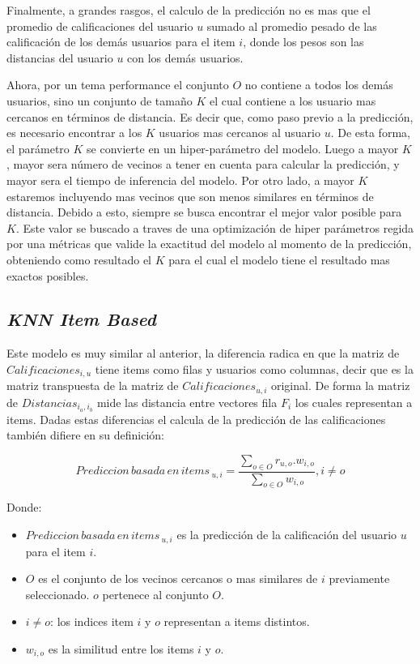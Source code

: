 \documentclass[11pt,a4paper,twoside]{thesis}
\begin{document}
Finalmente, a grandes rasgos, el calculo de la predicción no es mas que el promedio de calificaciones del usuario $u$ sumado al promedio pesado de las calificación de los demás usuarios para el item $i$, donde los pesos son las distancias del usuario $u$ con los demás usuarios.

Ahora, por un tema performance el conjunto $O$ no contiene a todos los demás usuarios, sino un conjunto de tamaño $K$ el cual contiene a los usuario mas cercanos en términos de distancia. Es decir que, como paso previo a la predicción, es necesario encontrar a los $K$ usuarios mas cercanos al usuario $u$. De esta forma, el parámetro $K$ se convierte en un hiper-parámetro del modelo. Luego a mayor $K$, mayor sera número de vecinos a tener en cuenta para calcular la predicción, y mayor sera el tiempo de inferencia del modelo. Por otro lado, a mayor $K$ estaremos incluyendo mas vecinos que son menos similares en términos de distancia. Debido a esto, siempre se busca encontrar el mejor valor posible para $K$. Este valor se buscado a traves de una optimización de hiper parámetros regida por una métricas que valide la exactitud del modelo al momento de la predicción, obteniendo como resultado el $K$ para el cual el modelo tiene el resultado mas exactos posibles.

\subsection{\textit{KNN Item Based}}

Este modelo es muy similar al anterior, la diferencia radica en que la matriz de $Calificaciones_{i, u}$ tiene items como filas y usuarios como columnas, decir que es la matriz transpuesta de la matriz de $Calificaciones_{u, i}$ original. De forma la matriz de $Distancias_{i_a,i_b}$ mide las distancia entre vectores fila $F_i$ los cuales representan a items. Dadas estas diferencias el calcula de la predicción de las calificaciones también difiere en su definición:


\begin{equation}
	Prediccion \mspace{3mu}basada \mspace{3mu}en \mspace{3mu}items\mspace{3mu}_{u, i} = \frac{\sum_{o \in O} r_{u, o}. w_{i, o} }{\sum_{o \in O} w_{i, o} }, i \neq o
\end{equation}
\begin{description}
	\item[Donde:]
\end{description}
\begin{itemize}
	\item $Prediccion \mspace{3mu}basada \mspace{3mu}en \mspace{3mu}items\mspace{3mu}_{u, i}$ es la predicción de la calificación del usuario $u$ para el item $i$.
	\item $O$ es el conjunto de los vecinos cercanos o mas similares de $i$ previamente seleccionado. $o$ pertenece al conjunto $O$.
	\item $i \neq o$: los indices item $i$ y $o$ representan a items distintos. 
	\item $w_{i,o}$ es la similitud entre los items $i$ y $o$.
\end{itemize}
\end{document}
